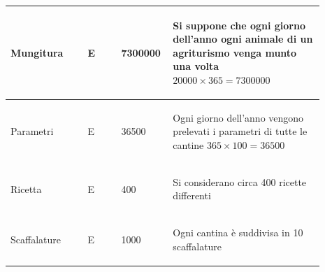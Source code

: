\documentclass[12pt,a4paper]{article}
\begin{document}
\begin{center}
\begin{longtable}{|p{0.23\linewidth}|p{0.1\linewidth}|p{0.11\linewidth}|p{0.45\linewidth}|}
\hline
Mungitura 				& \begin{center}
\vspace{-25pt}E
\end{center}
					& \begin{center}
					\vspace{-25pt}7300000\end{center}
					& \begin{flushleft}\vspace{-25pt} Si suppone che ogni giorno dell'anno ogni animale di un agriturismo venga munto una volta $20000\times 365 = 7300000$ \end{flushleft}\\ 

\hline
Parametri 				& \begin{center}
\vspace{-25pt}E
\end{center}
					& \begin{center}
					\vspace{-25pt}36500\end{center}
					& \begin{flushleft}\vspace{-25pt} Ogni giorno dell'anno vengono prelevati i parametri di tutte le cantine $365\times 100= 36500$ \end{flushleft}\\ 

\hline
Ricetta 				& \begin{center}
\vspace{-25pt}E
\end{center}
					& \begin{center}
					\vspace{-25pt}400\end{center}
					& \begin{flushleft}\vspace{-25pt} Si considerano circa 400 ricette differenti \end{flushleft}\\ 

\hline
Scaffalature 				& \begin{center}
\vspace{-25pt}E
\end{center}
					& \begin{center}
					\vspace{-25pt}1000\end{center}
					& \begin{flushleft}\vspace{-25pt} Ogni cantina è suddivisa in 10 scaffalature \end{flushleft}\\ 


\end{longtable}
\end{center}
\end{document}
